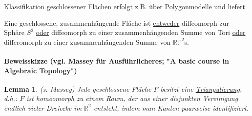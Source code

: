 \documentclass[a4paper,11pt,notitlepage]{report}
\newtheorem{lemma}{Lemma}[chapter]
\theoremstyle{definition}
\newcommand{\R}{{\ensuremath{\mathbb{R}}}}
\newcommand{\Prim}{{\ensuremath{\mathbb{P}}}}
\begin{document}
Klassifikation geschlossener Flächen erfolgt z.B. über Polygonmodelle und liefert

\begin{theorem}
	Eine geschlossene, zusammenhängende Fläche ist \underline{entweder} diffeomorph zur Sphäre $S^2$ \underline{oder} diffeomorph zu einer zusammenhängenden Summe von Tori \underline{oder} differomorph zu einer zusammenhängenden Summe von $\R \Prim^2$s.
\end{theorem}

\paragraph{Beweisskizze (vgl. Massey für Ausführlicheres; "A basic course in Algebraic Topology")}
\begin{lemma}
	(s. Massey) Jede geschlossene Fläche $F$ besitzt eine \underline{Triangulierung}, d.h.: $F$ ist homöomorph zu einem Raum, der aus einer disjunkten Vereinigung endlich vieler Dreiecke im $\R^2$ entsteht, indem man Kanten paarweise identifiziert.
\end{lemma}
\end{document}

